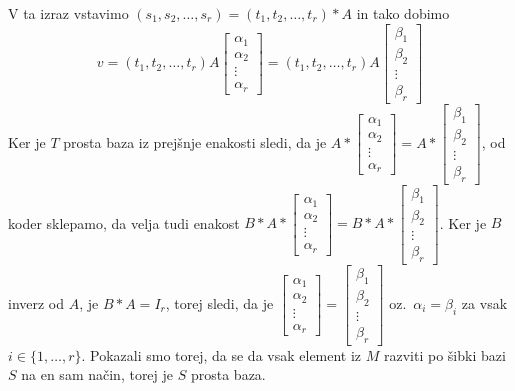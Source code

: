 \documentclass[mat1]{fmfdelo}
\begin{document}
\begin{dokaz}
V ta izraz vstavimo $(s_1, s_2, \ldots, s_r) = (t_1, t_2, \ldots, t_r)*A$ in tako dobimo $$ v = (t_1, t_2, \ldots, t_r)A\begin{bmatrix}
	\alpha_1 \\
	\alpha_2 \\
	\vdots \\
	\alpha_r 
\end{bmatrix} = (t_1, t_2, \ldots, t_r)A\begin{bmatrix}
	\beta_1 \\
	\beta_2 \\
	\vdots \\
	\beta_r 
\end{bmatrix}$$ Ker je $T$ prosta baza iz prejšnje enakosti sledi, da je $A*\begin{bmatrix}
\alpha_1 \\
\alpha_2 \\
\vdots \\
\alpha_r 
\end{bmatrix} = A*\begin{bmatrix}
\beta_1 \\
\beta_2 \\
\vdots \\
\beta_r 
\end{bmatrix}$, od koder sklepamo, da velja tudi enakost $B*A*\begin{bmatrix}
\alpha_1 \\
\alpha_2 \\
\vdots \\
\alpha_r 
\end{bmatrix} = B*A*\begin{bmatrix}
\beta_1 \\
\beta_2 \\
\vdots \\
\beta_r 
\end{bmatrix}$. Ker je $B$ inverz od $A$, je $B*A = I_r$, torej sledi, da je $\begin{bmatrix}
\alpha_1 \\
\alpha_2 \\
\vdots \\
\alpha_r 
\end{bmatrix} = \begin{bmatrix}
\beta_1 \\
\beta_2 \\
\vdots \\
\beta_r 
\end{bmatrix}$ oz.\ $\alpha_i = \beta_i$ za vsak $i\in \{1, \ldots, r\}$. Pokazali smo torej, da se da vsak element iz $M$ razviti po šibki bazi $S$ na en sam način, torej je $S$ prosta baza.
\end{dokaz}
\end{document}
